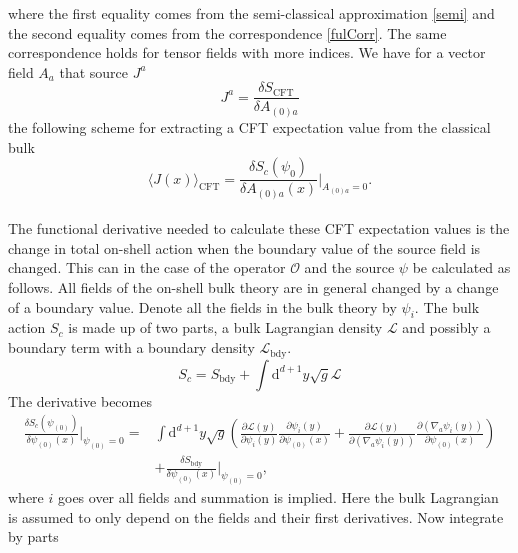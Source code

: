 \documentclass[12pt]{report}
\renewcommand{\d}{\ensuremath{\mathrm{d}}}
\renewcommand{\L}{\ensuremath{\mathcal{L}}}
\begin{document}
where the first equality comes from the semi-classical approximation \eqref{semi} and the second equality comes from the correspondence \eqref{fulCorr}. The same correspondence holds for tensor fields with more indices. We have for a vector field $A_a$ that source $J^a$
\begin{equation}
J^a= \frac{\delta S_{\mathrm{CFT}}}{\delta A_{(0)a}}
\end{equation}
the following scheme for extracting a CFT expectation value from the classical bulk
\begin{equation}
\langle J(x)\rangle_{\mathrm{CFT}}=\frac{\delta S_c(\psi_0)}{\delta A_{(0)a}(x)}|_{A_{(0)a}=0}.
\end{equation}\\
The functional derivative needed to calculate these CFT expectation values is the change in total on-shell action when the boundary value of the source field is changed. This can in the case of the operator $\mathcal{O}$ and the source $\psi$ be calculated as follows. All fields of the on-shell bulk theory are in general changed by a change of a boundary value. Denote all the fields in the bulk theory by $\psi_i$. The bulk action $S_c$ is made up of two parts, a bulk Lagrangian density $\L$ and possibly a boundary term with a boundary density $\L_{\mathrm{bdy}}$.
\begin{equation}
S_c=S_{\mathrm{bdy}}+\int \d^{d+1}y\sqrt{g}\L
\end{equation}
The derivative becomes
\begin{equation}
\begin{split}
\frac{\delta S_c(\psi_{(0)})}{\delta \psi_{(0)}(x)}|_{\psi_{(0)}=0}=&\int \d^{d+1}y\sqrt{g}\left(\frac{\partial\L(y)}{\partial \psi_i(y)}\frac{\partial \psi_i(y)}{\partial \psi_{(0)}(x)}+\frac{\partial\L(y)}{\partial (\nabla_a\psi_i(y))}\frac{\partial (\nabla_a\psi_i(y))}{\partial \psi_{(0)}(x)}\right)\\
&+\frac{\delta S_{\mathrm{bdy}}}{\delta \psi_{(0)}(x)}|_{\psi_{(0)}=0},
\end{split}
\end{equation}
where $i$ goes over all fields and summation is implied. Here the bulk Lagrangian is assumed to only depend on the fields and their first derivatives. Now integrate by parts
\end{document}
